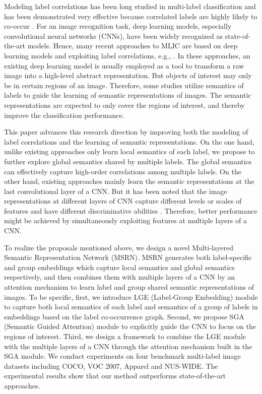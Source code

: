 \documentclass{article} \usepackage{nips14submit_e,times}
\begin{document}
Modeling label correlations has been long studied in multi-label classification and has been demonstrated very effective because correlated labels are highly likely to co-occur \cite{CVPR2019:ML-GCN}. For an image recognition task, deep learning models, especially convolutional neural networks (CNNs), have been widely recognized as state-of-the-art models. Hence, many recent approaches to MLIC are based on deep learning models and exploiting label correlations, e.g., \cite{CVPR2019:ML-GCN,AAAI2018:OFRNN,ICME2018:RCDH}.
In these approaches, an existing deep learning model is usually employed as a tool to transform a raw image into a high-level abstract representation. But objects of interest may only be in certain regions of an image. Therefore, some studies \cite{ICCV2017:RDAR,CVPR2017:LSRIS,AAAI2018:RARL,ICCV2019:ssgrl,AAAI2020:CMA} utilize semantics of labels to guide the learning of semantic representations of images. The semantic representations are expected to only cover the regions of interest, and thereby improve the classification performance.

This paper advances this research direction by improving both the modeling of label correlations and the learning of semantic representations. On the one hand, unlike existing approaches only learn local semantics of each label, we propose to further explore global semantics shared by multiple labels. The global semantics can effectively capture high-order correlations among multiple labels. On the other hand, existing approaches mainly learn the semantic representations at the last convolutional layer of a CNN.
But it has been noted that the image representations at different layers of CNN capture different levels or scales of features and have different discriminative abilities \cite{ECCV2016:UMDC,ICLR2018:MLAtt,DenseNet,ICCV2015:MSR}. Therefore, better performance might be achieved by simultaneously exploiting features at multiple layers of a CNN.

To realize the proposals mentioned above, we design a novel Multi-layered Semantic Representation Network (MSRN). MSRN generates both label-specific and group embeddings which capture local semantics and global semantics respectively,
and then combines them with multiple layers of a CNN by an attention mechanism to learn label and group shared semantic representations of images.
To be specific, first, we introduce LGE (Label-Group Embedding) module to capture both local semantics of each label and semantics of a group of labels in embeddings based on the label co-occurrence graph.
Second, we propose SGA (Semantic Guided Attention) module to explicitly guide the CNN to focus on the regions of interest.
Third, we design a framework to combine the LGE module with the multiple layers of
a CNN through the attention mechanism built in the SGA module.
We conduct experiments on four benchmark multi-label image datasets including COCO, VOC 2007, Apparel and NUS-WIDE.
The experimental results show that our method outperforms state-of-the-art approaches.
\end{document}
